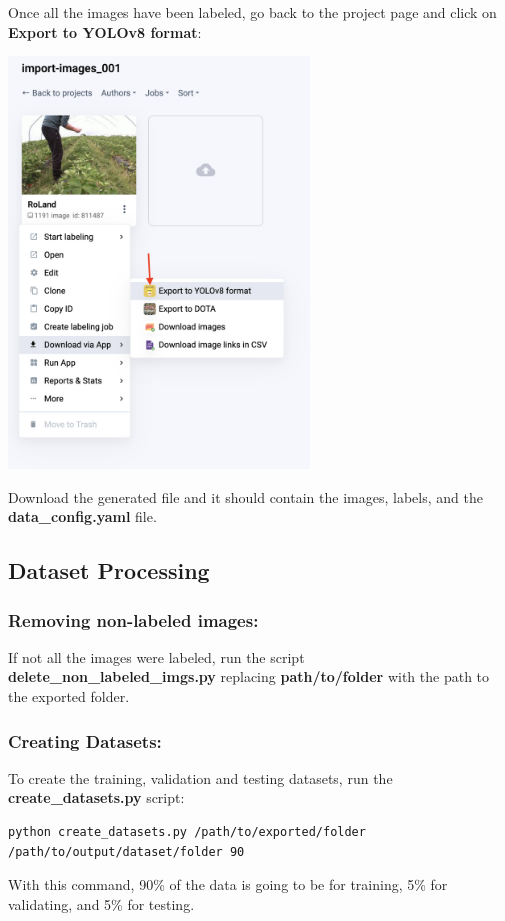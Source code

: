 \documentclass[12pt]{article}
\begin{document}
Once all the images have been labeled, go back to the project page and click on \textbf{Export to YOLOv8 format}:
\begin{center}
\includegraphics[width=0.6\textwidth]{Bilder/upload_10}
\end{center}
Download the generated file and it should contain the images, labels, and the \textbf{data\_config.yaml} file.


\subsection{Dataset Processing}
\subsubsection*{Removing non-labeled images:}
If not all the images were labeled, run the script \textbf{delete\_non\_labeled\_imgs.py} replacing \textbf{path/to/folder} with the path to the exported folder.

\subsubsection*{Creating Datasets:}
To create the training, validation and testing datasets, run the \textbf{create\_datasets.py} script:
\begin{lstlisting}[language=sh]
python create_datasets.py /path/to/exported/folder 
/path/to/output/dataset/folder 90
\end{lstlisting}
With this command, 90\% of the data is going to be for training, 5\% for validating, and 5\% for testing.
\newpage
\end{document}
